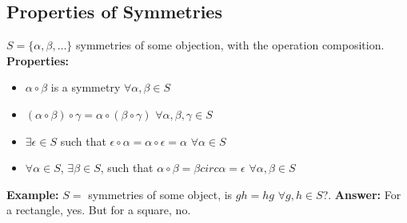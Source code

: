 \documentclass[openany]{report}
\begin{document}
\subsection{Properties of Symmetries}
    $S = \{\alpha, \beta, \dots\}$ symmetries of some objection, with the operation composition.
\textbf{Properties:}
\begin{itemize}
    \item $\alpha \circ \beta$ is a symmetry $\forall \alpha,\beta \in S$
    \item $(\alpha \circ \beta) \circ \gamma = \alpha \circ (\beta \circ \gamma)$ $\forall \alpha,\beta,\gamma \in S$
    \item $\exists \epsilon \in S$ such that $\epsilon \circ \alpha = \alpha \circ \epsilon = \alpha$ $\forall \alpha \in S$
    \item $\forall \alpha \in S$, $\exists \beta \in S$, such that $\alpha \circ \beta = \beta circ \alpha = \epsilon$ $\forall \alpha, \beta \in S$
\end{itemize}

\begin{center}
  \textit{}  
\end{center}

\textbf{Example:} $S =$ symmetries of some object, is $gh = hg$ $\forall g,h \in S$?.
\textbf{Answer:} For a rectangle, yes. But for a square, no.
\end{document}
